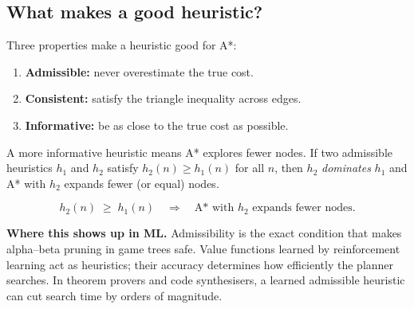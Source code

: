\documentclass[a4paper,11pt]{article}
\begin{document}
\subsection{What makes a good heuristic?}

Three properties make a heuristic good for A*:

\begin{enumerate}
  \item \textbf{Admissible:} never overestimate the true cost.
  \item \textbf{Consistent:} satisfy the triangle inequality across edges.
  \item \textbf{Informative:} be as close to the true cost as possible.
\end{enumerate}

A more informative heuristic means A* explores fewer nodes. If two
admissible heuristics $h_1$ and $h_2$ satisfy $h_2(n) \ge h_1(n)$ for all
$n$, then $h_2$ \emph{dominates} $h_1$ and A* with $h_2$ expands fewer
(or equal) nodes.

\[
  h_2(n) \;\ge\; h_1(n) \quad \Rightarrow \quad \text{A* with } h_2
  \text{ expands fewer nodes.}
\]

\medskip
\begin{center}\small
{}
\end{center}

\noindent\textbf{Where this shows up in ML.}
Admissibility is the exact condition that makes alpha--beta pruning in
game trees safe. Value functions learned by reinforcement learning act as
heuristics; their accuracy determines how efficiently the planner searches.
In theorem provers and code synthesisers, a learned admissible heuristic can
cut search time by orders of magnitude.
\end{document}
